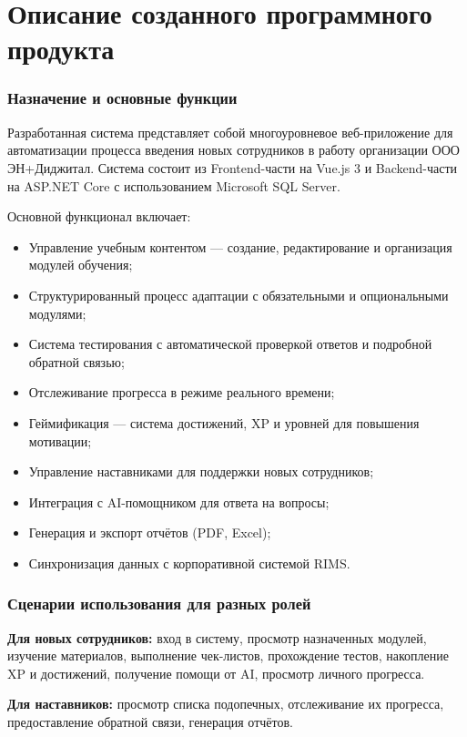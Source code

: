 \section{Описание созданного программного продукта}

\subsubsection*{Назначение и основные функции}

Разработанная система представляет собой многоуровневое веб-приложение для автоматизации процесса введения новых сотрудников в работу организации ООО ЭН+Диджитал. Система состоит из Frontend-части на Vue.js 3 и Backend-части на ASP.NET Core с использованием Microsoft SQL Server. 

Основной функционал включает:
\begin{itemize}
    \item Управление учебным контентом --- создание, редактирование и организация модулей обучения;
    \item Структурированный процесс адаптации с обязательными и опциональными модулями;
    \item Система тестирования с автоматической проверкой ответов и подробной обратной связью;
    \item Отслеживание прогресса в режиме реального времени;
    \item Геймификация --- система достижений, XP и уровней для повышения мотивации;
    \item Управление наставниками для поддержки новых сотрудников;
    \item Интеграция с AI-помощником для ответа на вопросы;
    \item Генерация и экспорт отчётов (PDF, Excel);
    \item Синхронизация данных с корпоративной системой RIMS.
\end{itemize}

\subsubsection*{Сценарии использования для разных ролей}

\textbf{Для новых сотрудников:} вход в систему, просмотр назначенных модулей, изучение материалов, выполнение чек-листов, прохождение тестов, накопление XP и достижений, получение помощи от AI, просмотр личного прогресса.

\textbf{Для наставников:} просмотр списка подопечных, отслеживание их прогресса, предоставление обратной связи, генерация отчётов.

